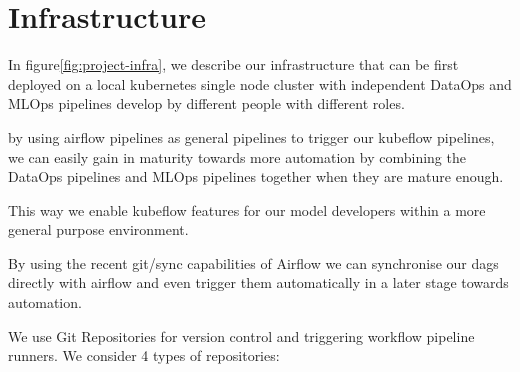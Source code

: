 \section{Infrastructure}\label{sec:infrastructure}

In figure\ref{fig:project-infra}, we describe our infrastructure that can be first deployed on a local kubernetes single node cluster
with independent DataOps and MLOps pipelines develop by different people with different roles.

by using airflow pipelines as general pipelines to trigger our kubeflow pipelines, we can easily gain in maturity towards
more automation by combining the DataOps pipelines and MLOps pipelines together when they are mature enough.

This way we enable kubeflow features for our model developers within a more general purpose environment.

By using the recent git/sync capabilities of Airflow we can synchronise our dags directly with airflow and
even trigger them automatically in a later stage towards automation.

We use Git Repositories for version control and triggering workflow pipeline runners.
We consider 4 types of repositories:

